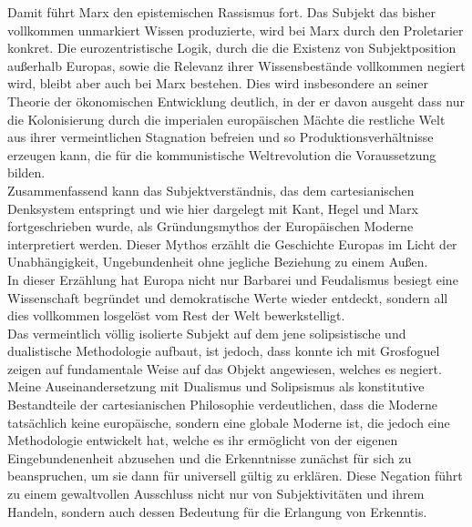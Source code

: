 \noindent Damit führt Marx den epistemischen Rassismus fort. Das Subjekt das bisher
vollkommen unmarkiert Wissen produzierte, wird bei Marx durch den Proletarier
konkret. Die eurozentristische Logik, durch die die Existenz von
Subjektposition außerhalb Europas, sowie die Relevanz ihrer Wissensbestände
vollkommen negiert wird, bleibt aber auch bei Marx bestehen.\footnotemark {}  Dies wird
insbesondere an seiner Theorie der ökonomischen Entwicklung deutlich, in der er
davon ausgeht dass nur die Kolonisierung durch die imperialen europäischen
Mächte die restliche Welt aus ihrer vermeintlichen Stagnation befreien und so
Produktionsverhältnisse erzeugen kann, die für die kommunistische
Weltrevolution die Voraussetzung bilden.\\

\noindent Zusammenfassend kann das Subjektverständnis, das dem cartesianischen Denksystem
entspringt und wie hier dargelegt mit Kant, Hegel und Marx fortgeschrieben
wurde, als Gründungsmythos der Europäischen Moderne interpretiert werden. \footnotemark {} 
Dieser Mythos erzählt die Geschichte Europas im Licht der Unabhängigkeit,
Ungebundenheit ohne jegliche Beziehung zu einem Außen.\\
 In dieser Erzählung hat
Europa nicht nur Barbarei und Feudalismus besiegt eine Wissenschaft begründet
und demokratische Werte wieder entdeckt, sondern all dies vollkommen losgelöst
vom Rest der Welt bewerkstelligt.\footnotemark {}\\
 Das vermeintlich völlig isolierte Subjekt
auf dem jene solipsistische und dualistische Methodologie aufbaut, ist jedoch,
dass konnte ich mit Grosfoguel zeigen auf fundamentale Weise auf das Objekt
angewiesen, welches es negiert. Meine Auseinandersetzung mit Dualismus und
Solipsismus als konstitutive Bestandteile der cartesianischen Philosophie
verdeutlichen, dass die Moderne tatsächlich keine europäische, sondern eine
globale Moderne ist, die jedoch eine Methodologie entwickelt hat, welche es ihr
ermöglicht von der eigenen Eingebundenenheit abzusehen und die Erkenntnisse
zunächst für sich zu beanspruchen, um sie dann für universell gültig zu
erklären. Diese Negation führt zu einem gewaltvollen Ausschluss nicht nur von
Subjektivitäten und ihrem Handeln, sondern auch dessen Bedeutung für die
Erlangung von Erkenntis.\\

